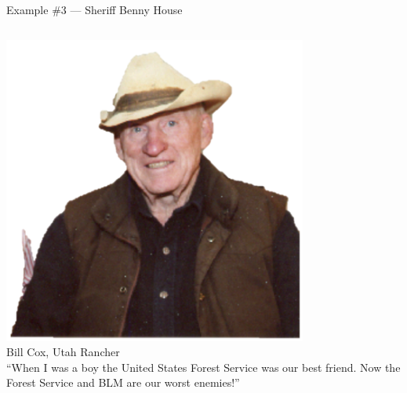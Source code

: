 
\begin{frame}{Example \#3 --- Sheriff Benny House}
    \begin{columns}[onlytextwidth]
            \centering
            \includegraphics[width=0.75\textwidth]{img/bill-cox.png} \\
            Bill Cox, Utah Rancher \\

            ``When I was a boy the United States Forest Service was our best friend. Now the Forest Service and BLM are our worst enemies!''
    \end{columns}
\end{frame}

